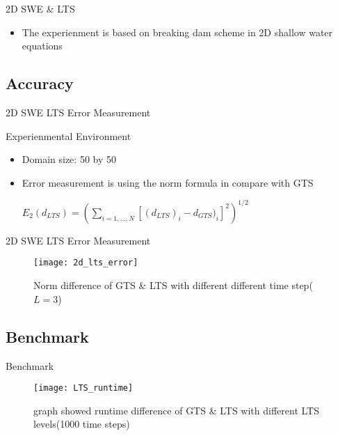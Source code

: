 \documentclass{beamer}
\begin{document}
\begin{frame}{2D SWE \& LTS}
\begin{itemize}
\item The experienment is based on breaking dam scheme in 2D shallow water equations\\
\begin{center}
\end{center}
\end{itemize}
\begin{center}
\end{center}
\end{frame}
\subsection{Accuracy}
\begin{frame}[t]{2D SWE LTS Error Measurement}
  \begin{block}{Experienmental Environment}
        \begin{itemize}
            \item Domain size: 50 by 50
            \item Error measurement is using the norm formula in compare with GTS\\
            \begin{center}
            	$E_{2}(d_{LTS}) = (\sum_{i=1,...,N}^{ }[(d_{LTS})_{i} - d_{GTS})_{i}]^{2})^{1/2}$
            \end{center}
        \end{itemize}
    \end{block}
\end{frame}
\begin{frame}{2D SWE LTS Error Measurement}
\begin{figure}[p]
    \centering
    \texttt{[image: 2d\_lts\_error]}
    \caption{Norm difference of GTS \& LTS with different different time step($L=3$)}
    \label{fig:awesome_image}
\end{figure}
\end{frame}
\subsection{Benchmark}
\begin{frame}{Benchmark}
\begin{figure}[p]
    \centering
    \texttt{[image: LTS\_runtime]}
    \caption{graph showed runtime difference of GTS \& LTS with different LTS levels(1000 time steps)}
    \label{fig:awesome_image}
\end{figure}
\end{frame}
\end{document}

